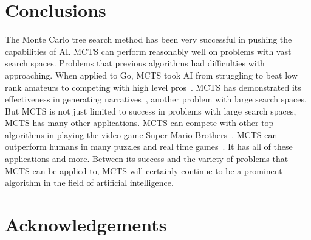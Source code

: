 \documentclass{sig-alternate}
\begin{document}
\section{Conclusions}
The Monte Carlo tree search method has been very successful in pushing the capabilities of AI. MCTS can perform reasonably well on problems with vast search spaces. Problems that previous algorithms had difficulties with approaching. When applied to Go, MCTS took AI from struggling to beat low rank amateurs to competing with high level pros~\cite{TheGrandChallenge}. MCTS has demonstrated its effectiveness in generating narratives~\cite{TheGrandChallenge}, another problem with large search spaces. But MCTS is not just limited to success in problems with large search spaces, MCTS has many other applications. MCTS can compete with other top algorithms in playing the video game Super Mario Brothers~\cite{Jacobsen:2014}. MCTS can outperform humans in many puzzles and real time games~\cite{Narrative}. It has all of these applications and more. Between its success and the variety of problems that MCTS can be applied to, MCTS will certainly continue to be a prominent algorithm in the field of artificial intelligence.

\section{Acknowledgements}


  
\end{document}
